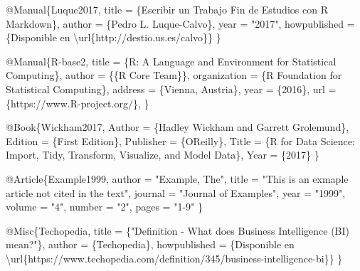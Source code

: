 \documentclass[12pt,a4paper,oneside,]{book}
\newenvironment{Shaded}{\begin{snugshade}}{\end{snugshade}}
\newcommand{\CharTok}[1]{\textcolor[rgb]{0.31,0.60,0.02}{#1}}
\newcommand{\DataTypeTok}[1]{\textcolor[rgb]{0.13,0.29,0.53}{#1}}
\newcommand{\NormalTok}[1]{#1}
\newcommand{\OtherTok}[1]{\textcolor[rgb]{0.56,0.35,0.01}{#1}}
\newcommand{\StringTok}[1]{\textcolor[rgb]{0.31,0.60,0.02}{#1}}
\newcommand{\VariableTok}[1]{\textcolor[rgb]{0.00,0.00,0.00}{#1}}
\numberwithin{dummy}{section}
\theoremstyle{ocrenumbox}
\theoremstyle{blacknumex}
\theoremstyle{blacknumbox}
\theoremstyle{ocrenum}
\theoremstyle{ocrenum}
\begin{document}
\begin{Shaded}
\begin{Highlighting}[]
\VariableTok{@Manual}\NormalTok{\{}\OtherTok{Luque2017}\NormalTok{,}
  \DataTypeTok{title}\NormalTok{ = \{Escribir un Trabajo Fin de Estudios con R Markdown\},}
  \DataTypeTok{author}\NormalTok{ = \{Pedro L. Luque{-}Calvo\},}
  \DataTypeTok{year}\NormalTok{ = "}\StringTok{2017}\NormalTok{",}
  \DataTypeTok{howpublished}\NormalTok{ = \{Disponible en }\CharTok{\textbackslash{}url}\NormalTok{\{http://destio.us.es/calvo\}\}}
\NormalTok{\}}

\VariableTok{@Manual}\NormalTok{\{}\OtherTok{R}\NormalTok{{-}}\OtherTok{base2}\NormalTok{,}
  \DataTypeTok{title}\NormalTok{ = \{R: A Language and Environment for Statistical}
\NormalTok{    Computing\},}
  \DataTypeTok{author}\NormalTok{ = \{\{R Core Team\}\},}
  \DataTypeTok{organization}\NormalTok{ = \{R Foundation for Statistical Computing\},}
  \DataTypeTok{address}\NormalTok{ = \{Vienna, Austria\},}
  \DataTypeTok{year}\NormalTok{ = \{2016\},}
  \DataTypeTok{url}\NormalTok{ = \{https://www.R{-}project.org/\},}
\NormalTok{\}}


\VariableTok{@Book}\NormalTok{\{}\OtherTok{Wickham2017}\NormalTok{,}
    \DataTypeTok{Author}\NormalTok{ = \{Hadley Wickham and Garrett Grolemund\},}
    \DataTypeTok{Edition}\NormalTok{ = \{First Edition\},}
    \DataTypeTok{Publisher}\NormalTok{ = \{O\textquotesingle{}Reilly\},}
    \DataTypeTok{Title}\NormalTok{ = \{R for Data Science: Import, Tidy, Transform, }
\NormalTok{    Visualize, and Model Data\},}
    \DataTypeTok{Year}\NormalTok{ = \{2017\}}
\NormalTok{\}}

\VariableTok{@Article}\NormalTok{\{}\OtherTok{Example1999}\NormalTok{,}
    \DataTypeTok{author}\NormalTok{  = "}\StringTok{Example, The}\NormalTok{",}
    \DataTypeTok{title}\NormalTok{   = "}\StringTok{This is an exmaple article not cited in the text}\NormalTok{",}
    \DataTypeTok{journal}\NormalTok{ = "}\StringTok{Journal of Examples}\NormalTok{",}
    \DataTypeTok{year}\NormalTok{    = "}\StringTok{1999}\NormalTok{",}
    \DataTypeTok{volume}\NormalTok{  = "}\StringTok{4}\NormalTok{",}
    \DataTypeTok{number}\NormalTok{  = "}\StringTok{2}\NormalTok{",}
    \DataTypeTok{pages}\NormalTok{   = "}\StringTok{1{-}9}\NormalTok{"}
\NormalTok{\}}

\VariableTok{@Misc}\NormalTok{\{}\OtherTok{Techopedia}\NormalTok{,}
  \DataTypeTok{title}\NormalTok{ = \{"Definition {-} What does Business Intelligence (BI) mean?"\},}
  \DataTypeTok{author}\NormalTok{ = \{Techopedia\},}
  \DataTypeTok{howpublished}\NormalTok{ = \{Disponible en}
  \CharTok{\textbackslash{}url}\NormalTok{\{https://www.techopedia.com/definition/345/business{-}intelligence{-}bi\}\}}
\NormalTok{\}}


\end{Highlighting}
\end{Shaded}
\end{document}
